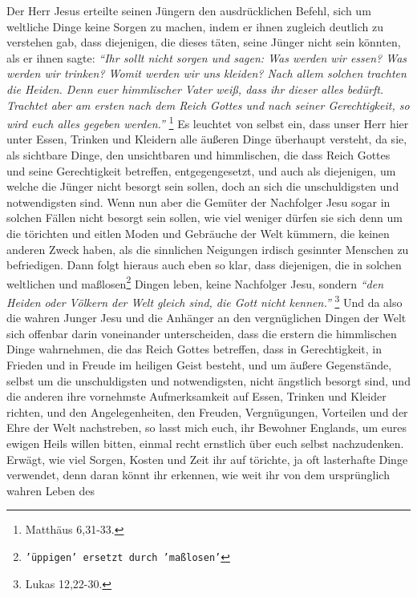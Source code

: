 Der Herr Jesus erteilte seinen Jüngern den ausdrücklichen Befehl, sich um
weltliche Dinge keine Sorgen zu machen, indem er ihnen zugleich deutlich zu
verstehen gab, dass diejenigen, die dieses täten, seine Jünger nicht sein
könnten, als er ihnen sagte:
\textit{"`Ihr sollt nicht sorgen und sagen: Was werden wir
essen? Was werden wir trinken? Womit werden wir uns kleiden? Nach allem solchen
trachten die Heiden. Denn euer himmlischer Vater weiß, dass ihr dieser alles
bedürft. Trachtet aber am ersten nach dem Reich Gottes und nach seiner
Gerechtigkeit, so wird euch alles gegeben werden."'}
\footnote{Matthäus 6,31-33.}
Es leuchtet von selbst ein, dass unser Herr hier unter Essen,
Trinken und Kleidern alle äußeren Dinge überhaupt versteht, da sie, als
sichtbare Dinge, den unsichtbaren und himmlischen, die dass Reich Gottes und
seine Gerechtigkeit betreffen, entgegengesetzt, und auch als diejenigen, um
welche die Jünger nicht besorgt sein sollen, doch an sich die unschuldigsten und
notwendigsten sind. Wenn nun aber die Gemüter der Nachfolger Jesu sogar in
solchen Fällen nicht besorgt sein sollen, wie viel weniger dürfen sie sich denn
um die törichten und eitlen Moden und Gebräuche der Welt kümmern, die keinen
anderen Zweck haben, als die sinnlichen Neigungen irdisch gesinnter Menschen zu
befriedigen. Dann folgt hieraus auch eben so klar, dass diejenigen, die in
solchen weltlichen und maßlosen\footnote{\texttt{'üppigen' ersetzt durch 'maßlosen'}}
Dingen leben, keine Nachfolger Jesu, sondern
\textit{"`den Heiden oder Völkern der Welt gleich sind, die Gott nicht
kennen."'}
\footnote{Lukas 12,22-30.}
Und da also die wahren Junger Jesu und die
Anhänger an den vergnüglichen Dingen der Welt sich offenbar darin voneinander
unterscheiden, dass die erstern die himmlischen Dinge wahrnehmen, die das Reich
Gottes betreffen, dass in Gerechtigkeit, in Frieden und in Freude im heiligen
Geist besteht, und um äußere Gegenstände, selbst um die unschuldigsten und
notwendigsten, nicht ängstlich besorgt sind, und die anderen ihre vornehmste
Aufmerksamkeit auf Essen, Trinken und Kleider richten, und den Angelegenheiten,
den Freuden, Vergnügungen, Vorteilen und der Ehre der Welt nachstreben, so lasst
mich euch, ihr Bewohner Englands, um eures ewigen Heils willen 
bitten, einmal
recht ernstlich über euch selbst nachzudenken. Erwägt, wie viel Sorgen, Kosten
und Zeit ihr auf törichte, ja oft lasterhafte Dinge verwendet, denn daran
könnt ihr erkennen, wie weit ihr von dem ursprünglich wahren Leben des
